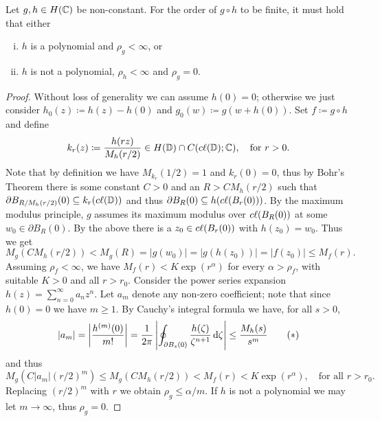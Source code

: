 \begin{theorem}[Pólya] \label{thm:polya}
    Let $g, h \in H(\mathbb{C})$ be non-constant. For the order of $g \circ h$ to be finite, it must hold that either
    \begin{enumerate}[i.]
        \item $h$ is a polynomial and $\rho_g < \infty$, or
        \item $h$ is not a polynomial, $\rho_h < \infty$ and $\rho_g = 0$.
    \end{enumerate}
\end{theorem}

\begin{proof}
    Without loss of generality we can assume $h(0) = 0$; otherwise we just consider $h_0(z) \coloneqq h(z) - h(0)$ and $g_0(w) \coloneqq g(w + h(0))$. Set $f \coloneqq g \circ h$ and define
    \begin{equation*}
        k_r(z) \coloneqq \frac{h(rz)}{M_h(r / 2)} \in H(\mathbb{D}) \cap C(c\ell({\mathbb{D}}); \mathbb{C}), \quad \textrm{for } r > 0.
    \end{equation*}
    Note that by definition we have $M_{k_r}(1/2) = 1$ and $k_r(0) = 0$, thus by Bohr's Theorem there is some constant $C > 0$ and an $R > C M_h(r/2)$ such that $\partial B_{R / M_h(r/2)}(0) \subseteq k_r(c\ell({\mathbb{D}}))$ and thus $\partial B_R(0) \subseteq h(c\ell({B_r(0)}))$. By the maximum modulus principle, $g$ assumes its maximum modulus over $c\ell({B_R(0)})$ at some $w_0 \in \partial B_R(0)$. By the above there is a $z_0 \in c\ell({B_r(0)})$ with $h(z_0) = w_0$. Thus we get
    \begin{equation*}
        M_g(C M_h(r / 2)) < M_g(R) = \vert g(w_0) \vert = \vert g(h(z_0)) \vert = \vert f(z_0) \vert \leq M_f(r).
    \end{equation*}
    Assuming $\rho_f < \infty$, we have $M_f(r) < K \exp(r^\alpha)$ for every $\alpha > \rho_f$, with suitable $K > 0$ and all $r > r_0$. Consider the power series expansion $h(z) = \sum_{n=0}^\infty a_n z^n$. Let $a_m$ denote any non-zero coefficient; note that since $h(0) = 0$ we have $m \geq 1$. By Cauchy's integral formula we have, for all $s > 0$,
    \begin{equation*} \label{eq:proof-polya-cauchy-inequality}
        \vert a_m \vert = \left\vert \frac{h^{(m)}(0)}{m!} \right\vert = \frac{1}{2\pi} \left\vert \oint_{\partial B_{s}(0)} \frac{h(\zeta)}{\zeta^{n+1}} \mathop{}\!\mathrm{d} \zeta \right\vert \leq \frac{M_h(s)}{s^m} \tag{\textasteriskcentered}
    \end{equation*}
    and thus
    \begin{equation*}
        M_g(C \vert a_m \vert (r/2)^m) \leq M_g(C M_h(r/2)) < M_f(r) < K \exp(r^\alpha), \quad \textrm{for all } r > r_0.
    \end{equation*}
    Replacing $(r/2)^m$ with $r$ we obtain $\rho_g \leq \alpha / m $. If $h$ is not a polynomial we may let $m \to \infty$, thus $\rho_g = 0$.


\end{proof}
